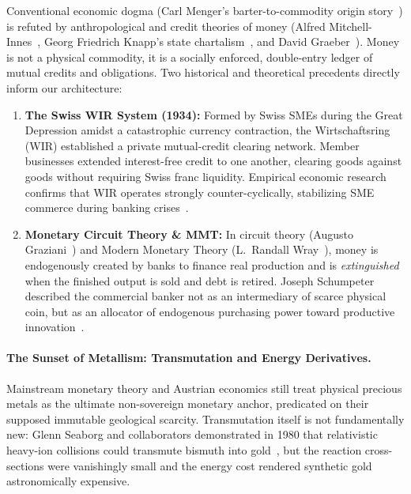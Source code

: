 \documentclass[a4paper,11pt,twoside,parskip=half-,headings=small]{scrartcl}
\begin{document}
Conventional economic dogma (Carl Menger's barter-to-commodity origin story~\cite{menger1892})
is refuted by anthropological and credit theories of money (Alfred Mitchell-Innes~\cite{mitchellinnes1913},
Georg Friedrich Knapp's state chartalism~\cite{knapp1924state}, and David Graeber~\cite{graeber2011}).
Money is not a physical commodity, it is a socially enforced, double-entry ledger of mutual
credits and obligations. Two historical and theoretical precedents directly inform our architecture:
\begin{enumerate}
  \item \textbf{The Swiss WIR System (1934):} Formed by Swiss SMEs during the Great
Depression amidst a catastrophic currency contraction, the Wirtschaftsring
(WIR) established a private mutual-credit clearing network. Member businesses
extended interest-free credit to one another, clearing goods against goods
without requiring Swiss franc liquidity. Empirical economic research confirms
that WIR operates strongly counter-cyclically, stabilizing SME commerce during
banking crises~\cite{stodder2009}.
  \item \textbf{Monetary Circuit Theory \& MMT:} In circuit theory (Augusto Graziani~\cite{graziani2003})
and Modern Monetary Theory (L.~Randall Wray~\cite{wray2015modern}), money is
endogenously created by banks to finance real production and is \emph{extinguished}
when the finished output is sold and debt is retired. Joseph Schumpeter described
the commercial banker not as an intermediary of scarce physical coin, but as an
allocator of endogenous purchasing power toward productive innovation~\cite{schumpeter1934}.
\end{enumerate}

\paragraph{The Sunset of Metallism: Transmutation and Energy Derivatives.}
\label{sec:transmutation_metallism}
Mainstream monetary theory and Austrian economics still treat physical precious metals as the ultimate non-sovereign monetary anchor, predicated on their supposed immutable geological scarcity. Transmutation itself is not fundamentally new: Glenn Seaborg and collaborators demonstrated in 1980 that relativistic heavy-ion collisions could transmute bismuth into gold~\cite{seaborg1981transmutation}, but the reaction cross-sections were vanishingly small and the energy cost rendered synthetic gold astronomically expensive.
\end{document}
